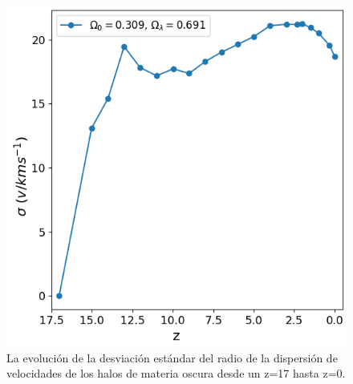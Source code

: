 \documentclass{beamer}
\begin{document}
\begin{frame}
\begin{columns}[t]
			\begin{column}{.5\textwidth}
				\begin{figure}
					\centering
					\includegraphics[scale=0.3]{RunCanonica/VelDisp_Std_RunCanonica.png}
					\caption{\footnotesize La evolución de la desviación estándar del radio de la dispersión de velocidades de los halos de materia oscura desde un z=17 hasta z=0.}
					\label{fig:Canon-VelDispStd}
				\end{figure}
			\end{column}
		\end{columns}

	\end{frame}	

\end{document}
